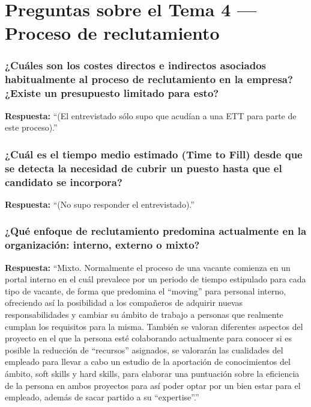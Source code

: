 \section{Preguntas sobre el Tema 4 — Proceso de reclutamiento}

\subsubsection*{¿Cuáles son los costes directos e indirectos asociados habitualmente al proceso de reclutamiento en la empresa? ¿Existe un presupuesto limitado para esto?}

\textbf{Respuesta:}\newline
``(El entrevistado sólo supo que acudían a una ETT para parte de este proceso).''

\subsubsection*{¿Cuál es el tiempo medio estimado (Time to Fill) desde que se detecta la necesidad de cubrir un puesto hasta que el candidato se incorpora?}

\textbf{Respuesta:}\newline
``(No supo responder el entrevistado).''

\subsubsection*{¿Qué enfoque de reclutamiento predomina actualmente en la organización: interno, externo o mixto?}

\textbf{Respuesta:}\newline
``Mixto. Normalmente el proceso de una vacante comienza en un portal interno en el cuál prevalece por un periodo de tiempo estipulado para cada tipo de vacante, de forma que predomina el ``moving'' para personal interno, ofreciendo así la posibilidad a los compañeros de adquirir nuevas responsabilidades y cambiar su ámbito de trabajo a personas que realmente cumplan los requisitos para la misma. También se valoran diferentes aspectos del proyecto en el que la persona esté colaborando actualmente para conocer si es posible la reducción de ``recursos'' asignados, se valorarán las cualidades del empleado para llevar a cabo un estudio de la aportación de conocimientos del ámbito, soft skills y hard skills, para elaborar una puntuación sobre la eficiencia de la persona en ambos proyectos para así poder optar por un bien estar para el empleado, además de sacar partido a su ``expertise''.''

